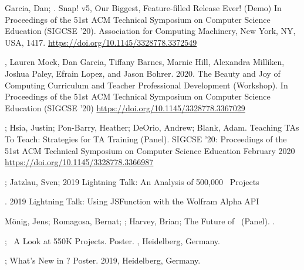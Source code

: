 \begin{etaremune}
    \item{Garcia, Dan; \me.
    \newline
    Snap! v5, Our Biggest, Feature-filled Release Ever! (Demo)
    \newline 
    In Proceedings of the 51st ACM Technical Symposium on Computer Science Education (SIGCSE '20). Association for Computing Machinery, New York, NY, USA, 1417. 
    \newline
    \href{https://doi.org/10.1145/3328778.3372549}{https://doi.org/10.1145/3328778.3372549}}
    
    \item{\me, Lauren Mock, Dan Garcia, Tiffany Barnes, Marnie Hill, Alexandra Milliken, Joshua Paley, Efrain Lopez, and Jason Bohrer. 2020. The Beauty and Joy of Computing Curriculum and Teacher Professional Development (Workshop). In Proceedings of the 51st ACM Technical Symposium on Computer Science Education (SIGCSE '20)
    \newline
    \href{https://doi.org/10.1145/3328778.3367029}{https://doi.org/10.1145/3328778.3367029}}
    
    \item{\me; Hsia, Justin; Pon-Barry, Heather; DeOrio, Andrew; Blank, Adam. Teaching TAs To Teach: Strategies for TA Training (Panel). SIGCSE '20: Proceedings of the 51st ACM Technical Symposium on Computer Science Education February 2020
    \newline
    \href{https://doi.org/10.1145/3328778.3366987}{https://doi.org/10.1145/3328778.3366987}}

    
    \item{\me; Jatzlau, Sven; \snapcon{} 2019 Lightning Talk: An Analysis of 500,000 \snap\ Projects}
    
    \item{\me. \snapcon{} 2019 Lightning Talk: Using JSFunction with the Wolfram Alpha API}
    
    \item{Mönig, Jens; Romagosa, Bernat; \me; Harvey, Brian; The Future of \snap\ (Panel). .}
    
    
    \item{\me; \snap\ A Look at 550K Projects. Poster. , Heidelberg, Germany.}
    
    \item{\me; What's New in ? Poster. \snapcon{} 2019, Heidelberg, Germany.}
    

\end{etaremune}
